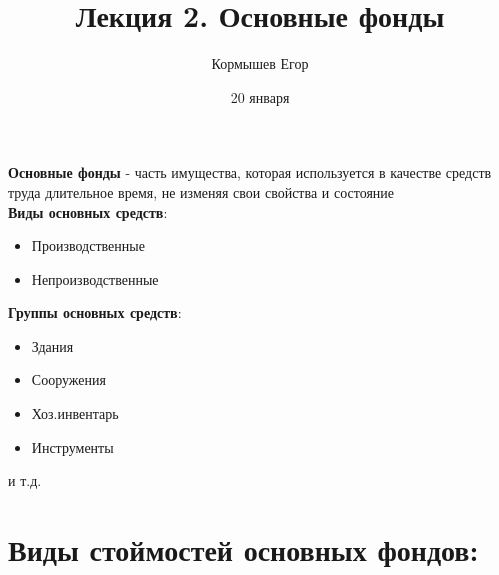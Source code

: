 \documentclass[11pt]{article}
\author{Кормышев Егор}
\date{20 января}
\title{Лекция 2. Основные фонды}
\begin{document}
\maketitle
\tableofcontents

\textbf{Основные фонды} - часть имущества, которая используется в качестве средств труда длительное время, не изменяя свои свойства и состояние \\[0pt]

\textbf{Виды основных средств}:

\begin{itemize}
\item Производственные
\item Непроизводственные
\end{itemize}

\textbf{Группы основных средств}:

\begin{itemize}
\item Здания
\item Сооружения
\item Хоз.инвентарь
\item Инструменты
\end{itemize}
и т.д.

\section{Виды стоймостей основных фондов:}
\label{sec:org98cee46}
\end{document}

